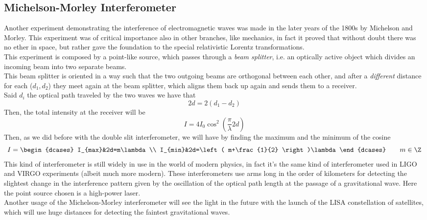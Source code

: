 \documentclass[../electromagnetism.tex]{subfiles}
\begin{document}
\subsection{Michelson-Morley Interferometer}
Another experiment demonstrating the interference of electromagnetic waves was made in the later years of the 1800s by Michelson and Morley. This experiment was of critical importance also in other branches, like mechanics, in fact it proved that without doubt there was no ether in space, but rather gave the foundation to the special relativistic Lorentz transformations.\\
This experiment is composed by a point-like source, which passes through a \textit{beam splitter}, i.e. an optically active object which divides an incoming beam into two separate beams.\\
This beam splitter is oriented in a way such that the two outgoing beams are orthogonal between each other, and after a \textit{different} distance for each ($d_1, d_2$) they meet again at the beam splitter, which aligns them back up again and sends them to a receiver.\\
Said $d_i$ the optical path traveled by the two waves we have that
\begin{equation*}
	2d=2(d_1-d_2)
\end{equation*}
Then, the total intensity at the receiver will be
\begin{equation}
	I=4I_0\cos^2\left( \frac{\pi}{\lambda}2d \right)
	\label{eq:michelsoninttot.mint}
\end{equation}
Then, as we did before with the double slit interferometer, we will have by finding the maximum and the minimum of the cosine
\begin{equation}
	I=\begin{dcases}
		I_{max}&2d=m\lambda\\
		I_{min}&2d=\left( m+\frac{1}{2} \right)\lambda
	\end{dcases}\qquad m\in\Z
	\label{eq:michelsonmaxint.mint}
\end{equation}
This kind of interferometer is still widely in use in the world of modern physics, in fact it's the same kind of interferometer used in LIGO and VIRGO experiments (albeit much more modern). These interferometers use arms long in the order of kilometers for detecting the slightest change in the interference pattern given by the oscillation of the optical path length at the passage of a gravitational wave. Here the point source chosen is a high-power laser.\\
Another usage of the Michelson-Morley interferometer will see the light in the future with the launch of the LISA constellation of satellites, which will use huge distances for detecting the faintest gravitational waves.
\end{document}
